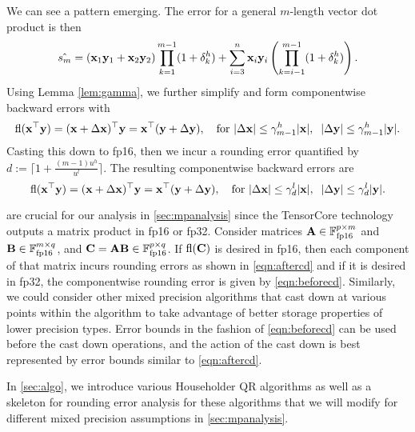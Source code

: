 We can see a pattern emerging. 
The error for a general $m$-length vector dot product is then
\begin{equation}
\label{eqn:dperr_2}
\hat{s_m} = (\bb{x}_1\bb{y}_1+\bb{x}_2\bb{y}_2)\prod_{k=1}^{m-1}(1+\dd_{k}^h) + \sum_{i=3}^n \bb{x}_i\bb{y}_i\left(\prod_{k=i-1}^{m-1}(1+\dd_{k}^{h})\right).
\end{equation}
Using Lemma \ref{lem:gamma}, we further simplify and form componentwise backward errors with
\begin{equation}
\fl(\bb{x}^{\top}\bb{y}) =(\bb{x}+\Delta\bb{x})^{\top}\bb{y} = \bb{x}^{\top}(\bb{y}+\Delta\bb{y}),\quad\text{for }|\Delta \bb{x}| \leq \gamma^h_{m-1}|\bb{x}|,\;\; |\Delta \bb{y}|  \leq \gamma_{m-1}^h|\bb{y}|. \label{eqn:beforecd}
\end{equation}
Casting this down to fp16, then we incur a rounding error quantified by $d:=\lceil1+\frac{(m-1)u^h}{u^l}\rceil$. 
The resulting componentwise backward errors are
\begin{equation}
\fl(\bb{x}^{\top}\bb{y}) = (\bb{x}+\Delta\bb{x})^{\top}\bb{y} = \bb{x}^{\top}(\bb{y}+\Delta\bb{y}),\quad\text{for }|\Delta \bb{x}| \leq \gamma^l_{d}|\bb{x}|,\;\; |\Delta \bb{y}|  \leq \gamma_{d}^l|\bb{y}|. \label{eqn:aftercd}
\end{equation}

 are crucial for our analysis in \cref{sec:mpanalysis} since the TensorCore technology outputs a matrix product in fp16 or fp32. 
Consider matrices $\mathbf{A}\in\mathbb{F}_{\text{fp16}}^{p\times m}$ and $\mathbf{B}\in\mathbb{F}_{\text{fp16}}^{m\times q}$, and $\mathbf{C}=\mathbf{A}\mathbf{B}\in\mathbb{F}_{\text{fp16}}^{p\times q}$.
If $\mathrm{fl}(\mathbf{C})$ is desired in fp16, then each component of that matrix incurs rounding errors as shown in \cref{eqn:aftercd} and if it is desired in fp32, the componentwise rounding error is given by \cref{eqn:beforecd}.
Similarly, we could consider other mixed precision algorithms that cast down at various points within the algorithm to take advantage of better storage properties of lower precision types. 
Error bounds in the fashion of \cref{eqn:beforecd} can be used before the cast down operations, and the action of the cast down is best represented by error bounds similar to \cref{eqn:aftercd}.\par

In \cref{sec:algo}, we introduce various Householder QR algorithms as well as a skeleton for rounding error analysis for these algorithms that we will modify for different mixed precision assumptions in \cref{sec:mpanalysis}.